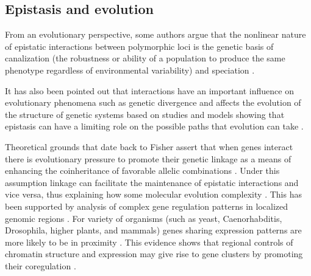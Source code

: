 
\subsection{Epistasis and evolution}

From an evolutionary perspective, some authors argue that the nonlinear nature of epistatic interactions between polymorphic loci is the genetic basis of canalization (the robustness or ability of a population to produce the same phenotype regardless of environmental variability) and speciation \cite{huang2012epistasis}.

It has also been pointed out that interactions have an important influence on evolutionary phenomena such as genetic divergence and affects the evolution of the structure of genetic systems \cite{phillips2008epistasis} based on studies and models showing that epistasis can have a limiting role on the possible paths that evolution can take \cite{phillips2008epistasis:REF}.

Theoretical grounds that date back to Fisher assert that when genes interact there is evolutionary pressure to promote their genetic linkage as a means of enhancing the coinheritance of favorable allelic combinations \cite{petkov2005evidence:REF_FISHER}.
Under this assumption linkage can facilitate the maintenance of epistatic interactions and vice versa, thus explaining how some molecular evolution complexity \cite{phillips2008epistasis}.
This has been supported by analysis of complex gene regulation patterns in localized genomic regions \cite{phillips2008epistasis:REF}.
For variety of organisms (such as yeast, Caenorhabditis, Drosophila, higher plants, and mammals) genes sharing expression patterns are more likely to be in proximity \cite{petkov2005evidence:REF}.
This evidence shows that regional controls of chromatin structure and expression may give rise to gene clusters by promoting their coregulation \cite{petkov2005evidence}.

